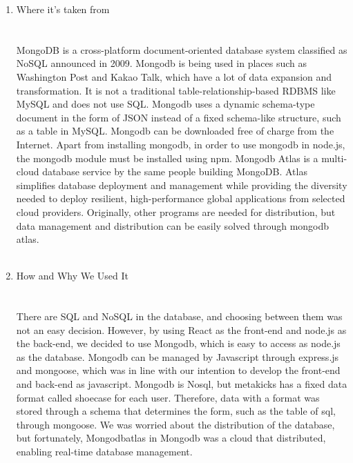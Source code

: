 \documentclass[conference]{IEEEtran}
\begin{document}
\begin{enumerate}
\item Where it's taken from\\
\\\\MongoDB is a cross-platform document-oriented database system classified as NoSQL announced in 2009. Mongodb is being used in places such as Washington Post and Kakao Talk, which have a lot of data expansion and transformation. It is not a traditional table-relationship-based RDBMS like MySQL and does not use SQL. Mongodb uses a dynamic schema-type document in the form of JSON instead of a fixed schema-like structure, such as a table in MySQL. Mongodb can be downloaded free of charge from the Internet. Apart from installing mongodb, in order to use mongodb in node.js, the mongodb module must be installed using npm. Mongodb Atlas is a multi-cloud database service by the same people building MongoDB. Atlas simplifies database deployment and management while providing the diversity needed to deploy resilient, high-performance global applications from selected cloud providers. Originally, other programs are needed for distribution, but data management and distribution can be easily solved through mongodb atlas.\\\\
\item How and Why We Used It\\
\\\\There are SQL and NoSQL in the database, and choosing between them was not an easy decision. However, by using React as the front-end and node.js as the back-end, we decided to use Mongodb, which is easy to access as node.js as the database. Mongodb can be managed by Javascript through express.js and mongoose, which was in line with our intention to develop the front-end and back-end as javascript. Mongodb is Nosql, but metakicks has a fixed data format called shoecase for each user. Therefore, data with a format was stored through a schema that determines the form, such as the table of sql, through mongoose. We was worried about the distribution of the database, but fortunately, Mongodbatlas in Mongodb was a cloud that distributed, enabling real-time database management.\\\\
\end{enumerate}
\end{document}
